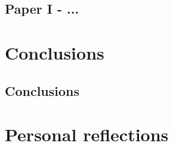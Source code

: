 \documentclass[electronic]{kthesis}
\begin{document}
\section{Paper I - ...}

\chapter{Conclusions}
\label{Conclusions}
\noindent \lipsum[1]

\section{Conclusions}
\noindent \lipsum[1]

\chapter{Personal reflections}
\label{PersonalReflections}
\noindent \lipsum[1]


\renewcommand{\bibname}{References}%

\end{document}
